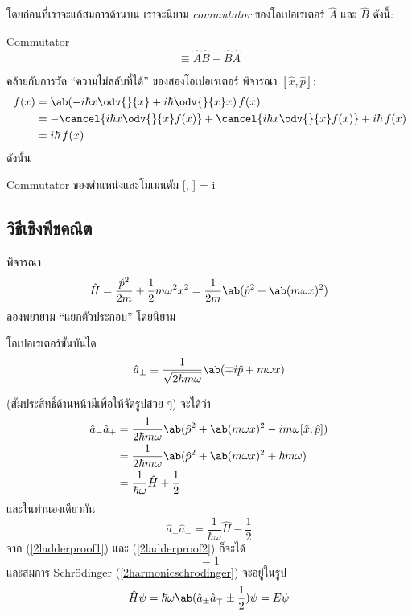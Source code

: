 โดยก่อนที่เราจะแก้สมการด้านบน เราจะนิยาม \emph{commutator} ของโอเปอเรเตอร์ $\hat{A}$ และ $\hat{B}$ ดังนี้:
\begin{defbox}{ Commutator}
    \begin{equation}
        [\hat{A}, \hat{B}] \equiv \hat{A}\hat{B} - \hat{B}\hat{A}
    \end{equation}
\end{defbox}
คล้ายกับการวัด ``ความไม่สลับที่ได้'' ของสองโอเปอเรเตอร์ พิจารณา $[\hat{x}, \hat{p}]$:
\begin{align*}
    [\hat{x}, \hat{p}]\,f(x) &= \ab(-i\hbar x\odv{}{x} + i\hbar\odv{}{x}x)\,f(x)\\
    &= -\cancel{i\hbar x\odv{}{x}f(x)} + \cancel{i\hbar x\odv{}{x}f(x)} + i\hbar \,f(x)\\
    &= i\hbar\,f(x)
\end{align*}
ดังนั้น
\begin{eqbox}{Commutator ของตำแหน่งและโมเมนตัม}
    [, ] = i\hbar
\end{eqbox}

\subsection{วิธีเชิงพีชคณิต}

พิจารณา
\[
\hat{H} = \frac{\hat{p}^2}{2m} + \frac{1}{2}m\omega^2x^2 = \frac{1}{2m}\ab(\hat{p}^2 + \ab(m\omega x)^2)
\]
ลองพยายาม ``แยกตัวประกอบ'' โดยนิยาม
\begin{defbox}{โอเปอเรเตอร์ขั้นบันได}
    \begin{equation}
        \hat{a}_\pm \equiv \frac{1}{\sqrt{2\hbar m\omega}}\ab(\mp i\hat{p} + m\omega x)
    \end{equation}
\end{defbox}
(สัมประสิทธิ์ด้านหน้ามีเพื่อให้จัดรูปสวย ๆ) จะได้ว่า
\begin{align}
    \hat{a}_-\hat{a}_+ &= \frac{1}{2\hbar m\omega}\ab(\hat{p}^2 + \ab(m\omega x)^2 -im\omega[\hat{x}, \hat{p}])\notag\\
    &= \frac{1}{2\hbar m\omega}\ab(\hat{p}^2 + \ab(m\omega x)^2 +\hbar m\omega)\notag\\
    &= \frac{1}{\hbar\omega}\hat{H} + \frac{1}{2}\label{2ladderproof1}
\end{align}
และในทำนองเดียวกัน
\begin{equation}
    \hat{a}_+\hat{a}_- = \frac{1}{\hbar\omega}\hat{H} - \frac{1}{2}\label{2ladderproof2}
\end{equation}
จาก (\ref{2ladderproof1}) และ (\ref{2ladderproof2}) ก็จะได้
\begin{equation}
    [\hat{a}_-, \hat{a}_+] = 1
\end{equation}
และสมการ Schrödinger (\ref{2harmonicschrodinger}) จะอยู่ในรูป
\begin{equation}
    \hat{H}\psi = \hbar\omega\ab(\hat{a}_\pm\hat{a}_\mp \pm \frac{1}{2})\psi = E\psi
\end{equation}

